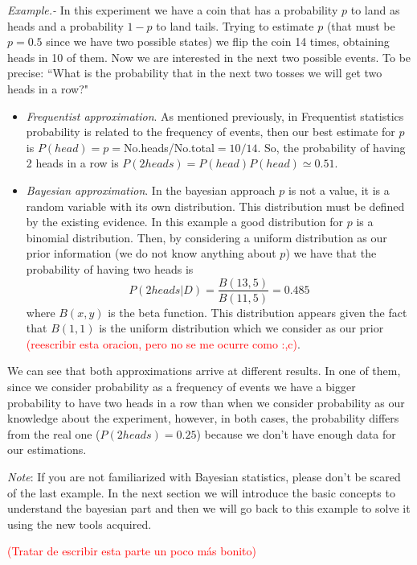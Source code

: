 \documentclass[onecolumn,           %
               showpacs,            %
               preprintnumbers,     %
               aps,                 %
               prl,          	    %
               letterpaper,             %
               superscriptaddress,      %
               nofootinbib,         %
               tightenlines,        %
               floats,floatfix      %
               ,usenatbib,
               ]{revtex4-1}
\begin{document}
\textit{Example.-} In this experiment we have a coin that has a probability $p$ to land as heads and a probability $1-p$ to land tails. Trying to estimate $p$ (that must be $p=0.5$ since we have two possible states) we flip the coin 14 times, obtaining heads in 10 of them. Now we are interested in the next two possible events. To be precise: ``What is the probability that in the next two tosses we will get two heads in a row?"
\begin{itemize}
\item \textit{Frequentist approximation}. As mentioned previously, in Frequentist statistics probability is related to the frequency of events, then our best estimate for $p$ is $P(head)=p=$No.heads/No.total$=10/14$. So, the probability of having 2 heads in a row is $P(2heads)=P(head)P(head)\simeq 0.51$.  
\item \textit{Bayesian approximation}. In the bayesian approach $p$ is not a value, it is a random variable with its own distribution. This distribution must be defined by the existing evidence. In this example a good distribution for $p$ is a binomial distribution. Then, by considering a uniform distribution as our prior information (we do not know anything about $p$) we have that the probability of having two heads is
\[
P(2heads|D)=\frac{B(13,5)}{B(11,5)}=0.485
\]
where $B(x,y)$ is the beta function. This distribution appears given the fact that $B(1,1)$ is the uniform distribution which we consider as our prior \textcolor{red}{(reescribir esta oracion, pero no se me ocurre como :,c)}.
\end{itemize}

We can see that both approximations arrive at different results. In one of them, since we consider probability as a frequency of events we have a bigger probability to have two heads in a row than when we consider probability as our knowledge about the experiment, however, in both cases, the probability differs from the real one ($P(2heads)=0.25$) because we don't have enough data for our estimations.

\textit{Note}: If you are not familiarized with Bayesian statistics, please don't be scared of the last example. In the next section we will introduce the basic concepts to understand the bayesian part and then we will go back to this example to solve it using the new tools acquired.   

\textcolor{red}{(Tratar de escribir esta parte un poco m\'as bonito)}
\end{document}
